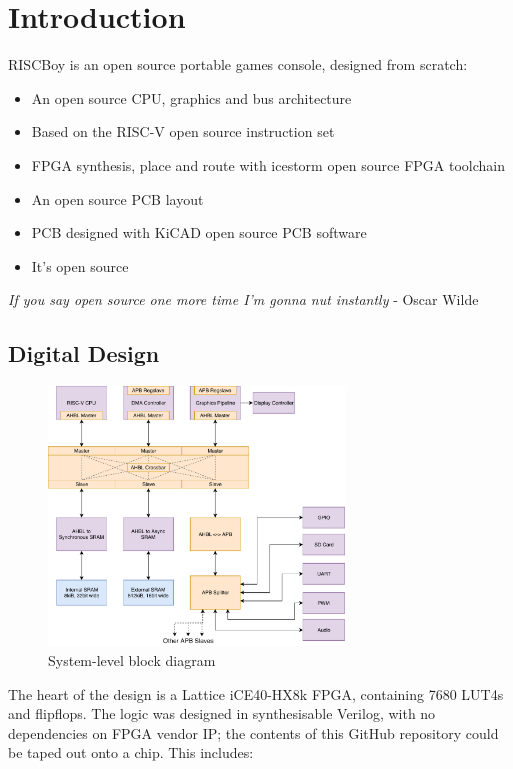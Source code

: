 \section{Introduction}

RISCBoy is an open source portable games console, designed from scratch:

\begin{itemize}
\item An open source CPU, graphics and bus architecture
\item Based on the RISC-V open source instruction set
\item FPGA synthesis, place and route with icestorm open source FPGA toolchain
\item An open source PCB layout
\item PCB designed with KiCAD open source PCB software
\item It's open source
\end{itemize}

\begin{displayquote}
{\it If you say open source one more time I'm gonna nut instantly} - Oscar Wilde
\end{displayquote}

\subsection{Digital Design}

\begin{figure}[!htb]
\caption{System-level block diagram}
\label{diagram:system_arch}
\centering
\includegraphics[width=0.7\textwidth]{diagrams/system_arch.pdf}
\end{figure}

The heart of the design is a Lattice iCE40-HX8k FPGA, containing 7680 LUT4s and flipflops. The logic was designed in synthesisable Verilog, with no dependencies on FPGA vendor IP; the contents of this GitHub repository could be taped out onto a chip. This includes:

